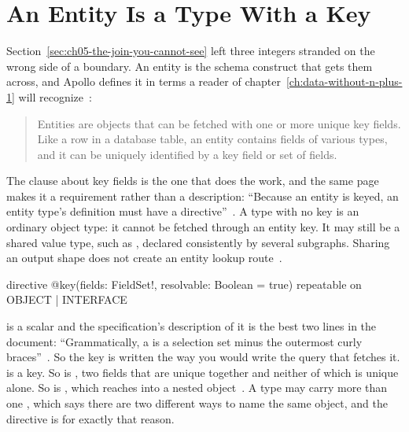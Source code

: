 \section{An Entity Is a Type With a Key}
\label{sec:ch05-an-entity-is-a-type-with-a-key}

%
Section~\ref{sec:ch05-the-join-you-cannot-see} left three integers stranded on
the wrong side of a boundary. An entity is the schema construct that gets them
across, and Apollo defines it in terms a reader of
chapter~\ref{ch:data-without-n-plus-1} will recognize~\autocite{apolloentities}:

\begin{quote}
Entities are objects that can be fetched with one or more unique key fields.
Like a row in a database table, an entity contains fields of various types, and
it can be uniquely identified by a key field or set of fields.
\end{quote}

%
The clause about key fields is the one that does the work, and the same page
makes it a requirement rather than a description: \enquote{Because an entity is
keyed, an entity type's definition must have a 
directive}~\autocite{apolloentities}. A type with no key is an ordinary object
type: it cannot be fetched through an entity key. It may still be a shared
value type, such as , declared consistently by several
subgraphs. Sharing an output shape does not create an entity lookup
route~\autocite{apollosharedtypesrepair}.

\begin{graphqlsdl}
directive @key(fields: FieldSet!, resolvable: Boolean = true)
  repeatable on OBJECT | INTERFACE
\end{graphqlsdl}

%
 is a scalar and the specification's description of it is the
best two lines in the document: \enquote{Grammatically, a  is a
selection set minus the outermost curly
braces}~\autocite{apollosubgraphspec}. So the key is written the way you would
write the query that fetches it.  is a key. So is
, two fields that are unique together and neither of
which is unique alone. So is , which reaches
into a nested object~\autocite{apollodirectives}. A type may carry more than
one , which says there are two different ways to name the same
object, and the directive is  for exactly that reason.

